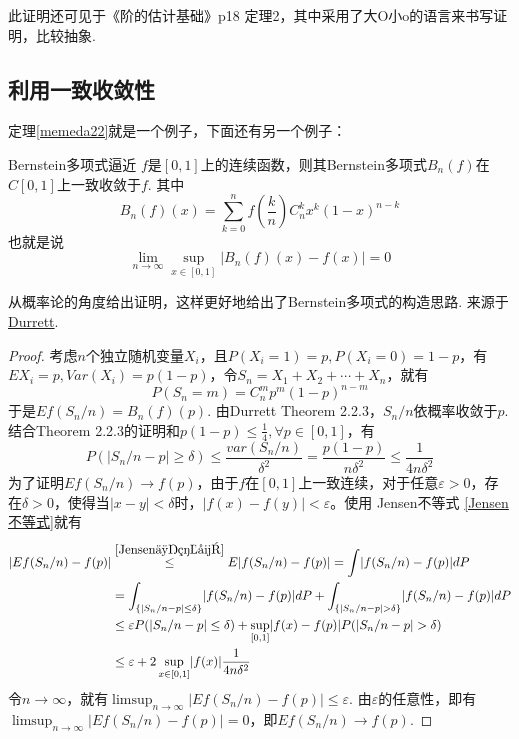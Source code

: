 \begin{remark}
    此证明还可见于《阶的估计基础》p18 定理2，其中采用了大O小o的语言来书写证明，比较抽象.
\end{remark}

\subsection{利用一致收敛性}

定理\cref{memeda22}就是一个例子，下面还有另一个例子：

\begin{theorem}{Bernstein多项式逼近}
    $f$是$[0,1]$上的连续函数，则其Bernstein多项式$B_n(f)$在$C[0,1]$上一致收敛于$f$. 其中
    $$
    B_n(f)(x)=\sum_{k=0}^{n}f\left(\frac{k}{n}\right)C_{n}^{k}x^k(1-x)^{n-k}
    $$
    也就是说
    $$
    \lim_{n\to \infty}\sup_{x\in [0,1]}\left|B_n(f)(x)-f(x)\right|=0
    $$
\end{theorem}


\begin{note}
    从概率论的角度给出证明，这样更好地给出了Bernstein多项式的构造思路. 来源于\href{https://easygl1der.github.io/MyWebsite/Book/PTE5_011119.pdf#page=66}{Durrett}.
\end{note}

\begin{proof}
    考虑$n$个独立随机变量$X_i$，且$P(X_i=1)=p,P(X_i=0)=1-p$，有$EX_i=p,Var(X_i)=p(1-p)$，令$S_n=X_1+X_2+\cdots+X_n$，就有
    $$
    P(S_n=m)=C_{n}^{m}p^m(1-p)^{n-m}
    $$ 
    于是$Ef(S_n/n)=B_n(f)(p)$. 由Durrett Theorem 2.2.3，$S_n/n$依概率收敛于$p$. 结合Theorem 2.2.3的证明和$p(1-p)\le \frac{1}{4},\forall p\in [0,1]$，有
    $$
    P(\lvert S_n/n-p\rvert\ge \delta)\le \frac{var(S_n/n)}{\delta^2}= \frac{p(1-p)}{n\delta^2} \le \frac{1}{4n\delta^2}
    $$
    为了证明$Ef(S_n/n)\to f(p)$，由于$f$在$[0,1]$上一致连续，对于任意$\varepsilon>0$，存在$\delta>0$，使得当$\left|x-y\right|<\delta$时，$\left|f(x)-f(y)\right|<\varepsilon$。使用 Jensen不等式 \cref{Jensen不等式}就有
    $$
    \begin{aligned}
        \lvert Ef(S_n/n)-f(p)\rvert & \overset{\cref{Jensen不等式}}{\le} E\lvert f(S_n/n)-f(p)\rvert = \int\lvert f(S_n/n)-f(p)\rvert dP\\
        & =\int_{\{\lvert S_n/n-p\rvert\le \delta\}}\lvert f(S_n/n)-f(p)\rvert dP+\int_{\{\lvert S_n/n-p\rvert>\delta\}}\lvert f(S_n/n)-f(p)\rvert dP\\
        & \le \varepsilon P(\lvert S_n/n-p\rvert\le \delta)+\sup_{[0,1]}\lvert f(x)-f(p)\rvert P(\lvert S_n/n-p\rvert>\delta)\\
        & \le \varepsilon + 2 \sup_{x\in [0,1]}\lvert f(x)\rvert \frac{1}{4n\delta^2}
    \end{aligned}
    $$
    令$n\to\infty$，就有$\limsup_{n\to \infty}\lvert Ef(S_n/n)-f(p)\rvert\le \varepsilon$. 由$\varepsilon$的任意性，即有$\limsup_{n\to \infty}\lvert Ef(S_n/n)-f(p)\rvert=0$，即$Ef(S_n/n)\to f(p)$.
\end{proof}

